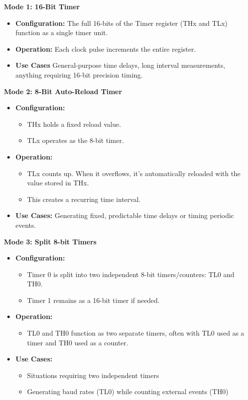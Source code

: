 \documentclass[
]{article}
\begin{document}
\textbf{Mode 1: 16-Bit Timer}

\begin{itemize}
\item
  \textbf{Configuration:} The full 16-bits of the Timer register (THx
  and TLx) function as a single timer unit.
\item
  \textbf{Operation:} Each clock pulse increments the entire register.
\item
  \textbf{Use Cases} General-purpose time delays, long interval
  measurements, anything requiring 16-bit precision timing.
\end{itemize}

\textbf{Mode 2: 8-Bit Auto-Reload Timer}

\begin{itemize}
\item
  \textbf{Configuration:}

  \begin{itemize}
  \item
    THx holds a fixed reload value.
  \item
    TLx operates as the 8-bit timer.
  \end{itemize}
\item
  \textbf{Operation:}

  \begin{itemize}
  \item
    TLx counts up. When it overflows, it's automatically reloaded with
    the value stored in THx.
  \item
    This creates a recurring time interval.
  \end{itemize}
\item
  \textbf{Use Cases:} Generating fixed, predictable time delays or
  timing periodic events.
\end{itemize}

\textbf{Mode 3: Split 8-bit Timers}

\begin{itemize}
\item
  \textbf{Configuration:}

  \begin{itemize}
  \item
    Timer 0 is split into two independent 8-bit timers/counters: TL0 and
    TH0.
  \item
    Timer 1 remains as a 16-bit timer if needed.
  \end{itemize}
\item
  \textbf{Operation:}

  \begin{itemize}
  \item
    TL0 and TH0 function as two separate timers, often with TL0 used as
    a timer and TH0 used as a counter.
  \end{itemize}
\item
  \textbf{Use Cases:}

  \begin{itemize}
  \item
    Situations requiring two independent timers
  \item
    Generating baud rates (TL0) while counting external events (TH0)
  \end{itemize}
\end{itemize}
\end{document}

